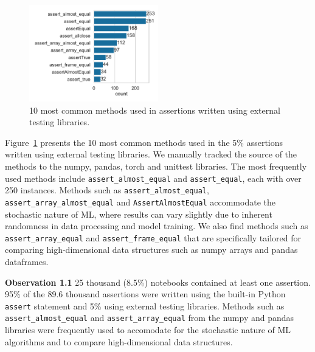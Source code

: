 \documentclass[smallextended]{svjour3}       %
\newcommand{\highlight}[1]{\begin{framed}%
  \noindent#1
\end{framed}}
\providecommand{\DIFaddbegin}{} %
\providecommand{\DIFaddend}{} %
\providecommand{\DIFdelbegin}{} %
\providecommand{\DIFdelend}{} %
\newcommand{\DIFscaledelfig}{0.5}
\newlength{\DIFdelgraphicswidth} %
\newlength{\DIFdelgraphicsheight} %
\newcommand{\DIFaddincludegraphics}[2][]{{\color{blue}\fbox{\DIFOincludegraphics[#1]{#2}}}} %
\newcommand{\DIFdelincludegraphics}[2][]{%
\sbox{\DIFdelgraphicsbox}{\DIFOincludegraphics[#1]{#2}}%
\settoboxwidth{\DIFdelgraphicswidth}{\DIFdelgraphicsbox} %
\settoboxtotalheight{\DIFdelgraphicsheight}{\DIFdelgraphicsbox} %
\scalebox{\DIFscaledelfig}{%
\parbox[b]{\DIFdelgraphicswidth}{\usebox{\DIFdelgraphicsbox}\\[-\baselineskip] \rule{\DIFdelgraphicswidth}{0em}}\llap{\resizebox{\DIFdelgraphicswidth}{\DIFdelgraphicsheight}{%
\setlength{\unitlength}{\DIFdelgraphicswidth}%
\begin{picture}(1,1)%
\thicklines\linethickness{2pt} %
{\color[rgb]{1,0,0}\put(0,0){\framebox(1,1){}}}%
{\color[rgb]{1,0,0}\put(0,0){\line( 1,1){1}}}%
{\color[rgb]{1,0,0}\put(0,1){\line(1,-1){1}}}%
\end{picture}%
}\hspace*{3pt}}} %
} %
\DeclareRobustCommand{\DIFaddbegin}{\DIFOaddbegin \let\includegraphics\DIFaddincludegraphics} %
\DeclareRobustCommand{\DIFaddend}{\DIFOaddend \let\includegraphics\DIFOincludegraphics} %
\DeclareRobustCommand{\DIFdelbegin}{\DIFOdelbegin \let\includegraphics\DIFdelincludegraphics} %
\DeclareRobustCommand{\DIFdelend}{\DIFOaddend \let\includegraphics\DIFOincludegraphics} %
\begin{document}
\begin{figure}
	\centering
	\includegraphics[width=0.5\textwidth]{other-test-methods.pdf}
	\caption{10 most common methods used in assertions written using external testing libraries.}
	\label{fig:other-test-methods}
\end{figure}

Figure~\ref{fig:other-test-methods} presents the 10 most common methods used in the 5\% assertions written using external testing libraries. We manually tracked the source of the methods to the numpy, pandas, torch and unittest libraries. The most frequently used methods include \lstinline{assert_almost_equal} and \lstinline{assert_equal}, each with over 250 instances. Methods such as \lstinline{assert_almost_equal}, \lstinline{assert_array_almost_equal} and \lstinline{AssertAlmostEqual} accommodate the stochastic nature of ML, where results can vary slightly due to inherent randomness in data processing and model training. We also find methods such as \lstinline{assert_array_equal} and \lstinline{assert_frame_equal} that are specifically tailored for comparing high-dimensional data structures such as numpy arrays and pandas dataframes.

\DIFdelbegin %
\DIFdelend \DIFaddbegin \highlight{\textbf{Observation 1.1} 25 thousand (8.5\%) notebooks contained at least one assertion. 95\% of the 89.6 thousand assertions were written using the built-in Python {\color{blue}%
\lstinline{assert} %
}%
statement and 5\% using external testing libraries. Methods such as {\color{blue}%
\lstinline{assert_almost_equal} %
}%
and {\color{blue}%
\lstinline{assert_array_equal} %
}%
from the numpy and pandas libraries were frequently used to accomodate for the stochastic nature of ML algorithms and to compare high-dimensional data structures.}
\DIFaddend 
\end{document}
